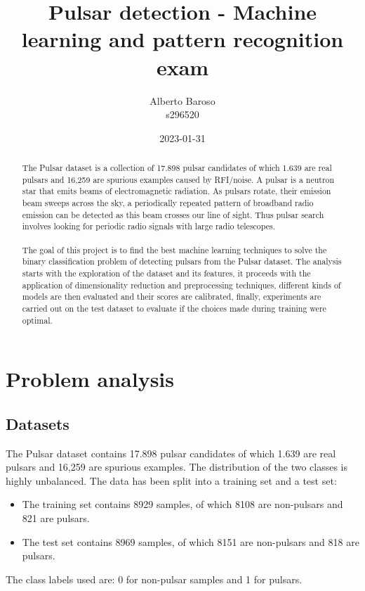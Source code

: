 \documentclass[12pt,a4paper]{article}
\begin{document}
\title{Pulsar detection - Machine learning and pattern recognition exam}
\author{Alberto Baroso \\ s296520}
\vspace{1cm}
\date{2023-01-31}
\maketitle
\clearpage

\begin{abstract}
    The Pulsar dataset \cite{stw656} is a collection of 17.898 pulsar candidates of which 1.639 are real pulsars and 16,259 are spurious examples caused by RFI/noise.
    A pulsar is a neutron star that emits beams of electromagnetic radiation.
    As pulsars rotate, their emission beam sweeps across the sky, a periodically repeated pattern of broadband radio emission can be detected as this beam crosses our line of sight.
    Thus pulsar search involves looking for periodic radio signals with large radio telescopes.
    \\ \\
    The goal of this project is to find the best machine learning techniques to solve the binary classification problem of detecting pulsars from the Pulsar dataset.
    The analysis starts with the exploration of the dataset and its features, it proceeds with the application of dimensionality reduction and preprocessing techniques,
    different kinds of models are then evaluated and their scores are calibrated, finally, experiments are carried out on the test dataset to evaluate if the choices made during training were optimal.
\end{abstract}
\clearpage

\tableofcontents
\clearpage

\section{Problem analysis}

\subsection{Datasets}

The Pulsar dataset \cite{stw656} contains 17.898 pulsar candidates of which 1.639 are real pulsars and 16,259 are spurious examples.
The distribution of the two classes is highly unbalanced.
The data has been split into a training set and a test set:
\begin{itemize}
    \item The training set contains 8929 samples, of which 8108 are non-pulsars and 821 are pulsars.
    \item The test set contains 8969 samples, of which 8151 are non-pulsars and 818 are pulsars.
\end{itemize}
The class labels used are: 0 for non-pulsar samples and 1 for pulsars.
\end{document}
